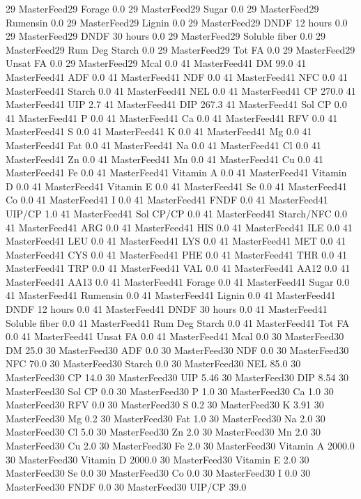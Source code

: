 \documentclass[letterpaper,10pt,english]{sphinxmanual}
\begin{document}
\begin{sphinxVerbatim}[commandchars=\\\{\},numbers=left,firstnumber=1,stepnumber=1]
29 MasterFeed29 \PYGZpc{} Forage 0.0
29 MasterFeed29 Sugar \PYGZpc{} 0.0
29 MasterFeed29 Rumensin 0.0
29 MasterFeed29 Lignin 0.0
29 MasterFeed29 DNDF 12 hours 0.0
29 MasterFeed29 DNDF 30 hours 0.0
29 MasterFeed29 Soluble fiber 0.0
29 MasterFeed29 Rum Deg Starch 0.0
29 MasterFeed29 Tot FA 0.0
29 MasterFeed29 Unsat FA 0.0
29 MasterFeed29 Mcal 0.0
41 MasterFeed41 DM 99.0
41 MasterFeed41 ADF 0.0
41 MasterFeed41 NDF 0.0
41 MasterFeed41 NFC 0.0
41 MasterFeed41 Starch 0.0
41 MasterFeed41 NEL 0.0
41 MasterFeed41 CP 270.0
41 MasterFeed41 UIP 2.7
41 MasterFeed41 DIP 267.3
41 MasterFeed41 Sol CP 0.0
41 MasterFeed41 P 0.0
41 MasterFeed41 Ca 0.0
41 MasterFeed41 RFV 0.0
41 MasterFeed41 S 0.0
41 MasterFeed41 K 0.0
41 MasterFeed41 Mg 0.0
41 MasterFeed41 Fat 0.0
41 MasterFeed41 Na 0.0
41 MasterFeed41 Cl 0.0
41 MasterFeed41 Zn 0.0
41 MasterFeed41 Mn 0.0
41 MasterFeed41 Cu 0.0
41 MasterFeed41 Fe 0.0
41 MasterFeed41 Vitamin A 0.0
41 MasterFeed41 Vitamin D 0.0
41 MasterFeed41 Vitamin E 0.0
41 MasterFeed41 Se 0.0
41 MasterFeed41 Co 0.0
41 MasterFeed41 I 0.0
41 MasterFeed41 FNDF 0.0
41 MasterFeed41 UIP/CP 1.0
41 MasterFeed41 Sol CP/CP 0.0
41 MasterFeed41 Starch/NFC 0.0
41 MasterFeed41 ARG 0.0
41 MasterFeed41 HIS 0.0
41 MasterFeed41 ILE 0.0
41 MasterFeed41 LEU 0.0
41 MasterFeed41 LYS 0.0
41 MasterFeed41 MET 0.0
41 MasterFeed41 CYS 0.0
41 MasterFeed41 PHE 0.0
41 MasterFeed41 THR 0.0
41 MasterFeed41 TRP 0.0
41 MasterFeed41 VAL 0.0
41 MasterFeed41 AA\PYGZsh{}12 0.0
41 MasterFeed41 AA\PYGZsh{}13 0.0
41 MasterFeed41 \PYGZpc{} Forage 0.0
41 MasterFeed41 Sugar \PYGZpc{} 0.0
41 MasterFeed41 Rumensin 0.0
41 MasterFeed41 Lignin 0.0
41 MasterFeed41 DNDF 12 hours 0.0
41 MasterFeed41 DNDF 30 hours 0.0
41 MasterFeed41 Soluble fiber 0.0
41 MasterFeed41 Rum Deg Starch 0.0
41 MasterFeed41 Tot FA 0.0
41 MasterFeed41 Unsat FA 0.0
41 MasterFeed41 Mcal 0.0
30 MasterFeed30 DM 25.0
30 MasterFeed30 ADF 0.0
30 MasterFeed30 NDF 0.0
30 MasterFeed30 NFC 70.0
30 MasterFeed30 Starch 0.0
30 MasterFeed30 NEL 85.0
30 MasterFeed30 CP 14.0
30 MasterFeed30 UIP 5.46
30 MasterFeed30 DIP 8.54
30 MasterFeed30 Sol CP 0.0
30 MasterFeed30 P 1.0
30 MasterFeed30 Ca 1.0
30 MasterFeed30 RFV 0.0
30 MasterFeed30 S 0.2
30 MasterFeed30 K 3.91
30 MasterFeed30 Mg 0.2
30 MasterFeed30 Fat 1.0
30 MasterFeed30 Na 2.0
30 MasterFeed30 Cl 5.0
30 MasterFeed30 Zn 2.0
30 MasterFeed30 Mn 2.0
30 MasterFeed30 Cu 2.0
30 MasterFeed30 Fe 2.0
30 MasterFeed30 Vitamin A 2000.0
30 MasterFeed30 Vitamin D 2000.0
30 MasterFeed30 Vitamin E 2.0
30 MasterFeed30 Se 0.0
30 MasterFeed30 Co 0.0
30 MasterFeed30 I 0.0
30 MasterFeed30 FNDF 0.0
30 MasterFeed30 UIP/CP 39.0

\end{sphinxVerbatim}
\end{document}
